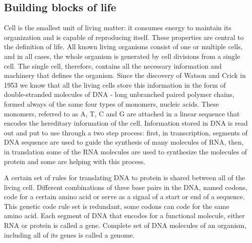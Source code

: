 \documentclass[11pt, a4paper,oneside]{report}
\begin{document}
\subsection{Building blocks of life}
Cell is the smallest unit of living matter: it consumes energy to maintain its organization and is capable of reproducing itself. These properties are central to the definition of life. All known living organisms consist of one or multiple cells, and in all cases, the whole organism is generated by cell divisions from a single cell. The single cell, therefore, contains all the necessary information and machinery that defines the organism.  Since the discovery of Watson and Crick in 1953\cite{Watson1974} we know that all the living cells store this information in the form of double-stranded molecules of DNA - long unbranched paired polymer chains, formed always of the same four types of monomers, nucleic acids. These monomers, referred to as A, T, C and G are attached  in a linear sequence that encodes the hereditary information of the cell. Information stored in DNA is read out and put to use through a two step process: first, in transcription, segments of DNA sequence are used to guide the synthesis of many molecules of RNA, then, in translation some of the RNA molecules are used to synthesize the molecules of protein and some are helping with this process\cite{rRNA}.

 A certain set of rules for translating DNA to protein is shared between all of the living cell.  Different combinations of three base pairs in the DNA, named codons, code for a certain amino acid or serve as a signal of a start or end of a sequence.  This genetic code rule set is redundant, some codons can code for the same amino acid\cite{Turanov2009}. Each segment of DNA that encodes for a functional molecule, either RNA or protein is called a gene\cite{Gerstein2007}.  Complete set of DNA molecules of an organism, including all of its genes is called a genome.  
\end{document}
